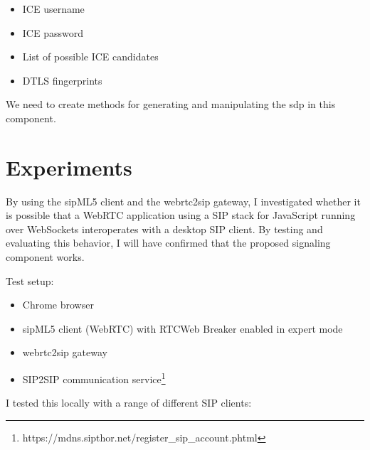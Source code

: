 \begin{itemize}
\item{ICE username}
\item{ICE password}
\item{List of possible ICE candidates}
\item{DTLS fingerprint}s
\end{itemize}

We need to create methods for generating and manipulating the \gls{sdp} in this component.

\section{Experiments}
\label{sec:experiments}
By using the sipML5 client and the webrtc2sip gateway, I investigated whether it is possible that a WebRTC application using a SIP stack for JavaScript running over WebSockets interoperates with a desktop SIP client. By testing and evaluating this behavior, I will have confirmed that the proposed signaling component works.

Test setup:
\begin{itemize}
\item Chrome browser
\item sipML5 client (WebRTC) with RTCWeb Breaker enabled in expert mode
\item webrtc2sip gateway
\item SIP2SIP communication service\footnote{https://mdns.sipthor.net/register\_sip\_account.phtml}
\end{itemize}
I tested this locally with a range of different SIP clients:

